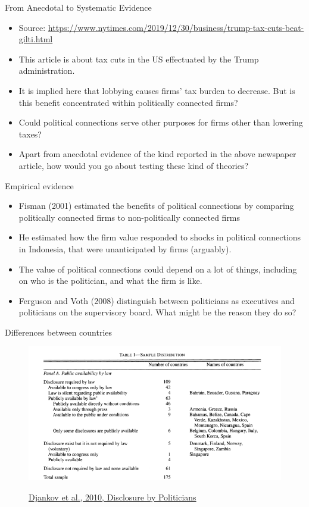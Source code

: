 \documentclass[aspectratio = 169, 12pt]{beamer}
\begin{document}
	\begin{frame}{From Anecdotal to Systematic Evidence}
	    \begin{itemize}
	        \item Source: \url{https://www.nytimes.com/2019/12/30/business/trump-tax-cuts-beat-gilti.html}
	        \item This article is about tax cuts in the US effectuated by the Trump administration. 
	        \item It is implied here that lobbying causes firms' tax burden to decrease. But is this benefit concentrated within politically connected firms?
	        \item Could political connections serve other purposes for firms other than lowering taxes?
	        \item Apart from anecdotal evidence of the kind reported in the above newspaper article, how would you go about testing these kind of theories?
	    \end{itemize}
	\end{frame}
	
	\begin{frame}{Empirical evidence}
	    \begin{itemize}
	        \item Fisman (2001) estimated the benefits of political connections by comparing politically connected firms to non-politically connected firms 
	        \item He estimated how the firm value responded to shocks in political connections in Indonesia, that were unanticipated by firms (arguably). 
	        \item The value of political connections could depend on a lot of things, including on who is the politician, and what the firm is like. 
	        \item Ferguson and Voth (2008) distinguish between politicians as executives and politicians on the supervisory board. What might be the reason they do so? 
	    \end{itemize}
	\end{frame}
	
	
	\begin{frame}{Differences between countries}
	    \begin{figure}
	        \centering
	        \includegraphics[width = 0.8 \textwidth]{screen7.png}
	        \label{fig:my_label}
	        \caption{\href{https://www.aeaweb.org/articles?id=10.1257/app.2.2.179}{Djankov et al., 2010, Disclosure by Politicians}}
	    \end{figure}
	\end{frame}
	
\end{document}
